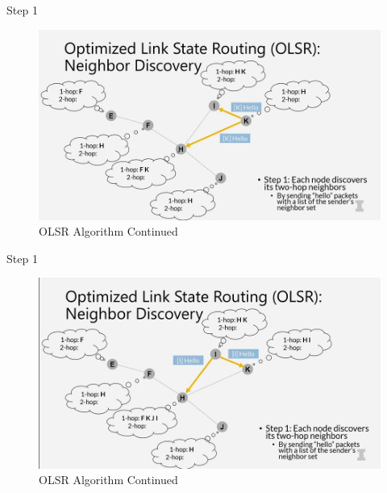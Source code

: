 \documentclass[11pt]{beamer}              %
\begin{document}
\begin{frame}{Step 1}

    \begin{figure}
        \centering
        \includegraphics[width=\textwidth]{figures/olsr4.png}
        \caption{OLSR Algorithm Continued \cite{coursera}}
    \end{figure}    
    
\end{frame}

\begin{frame}{Step 1}

    \begin{figure}
        \centering
        \includegraphics[width=\textwidth]{figures/olsr5.png}
        \caption{OLSR Algorithm Continued \cite{coursera}}
    \end{figure}    
    
\end{frame}
\end{document}
